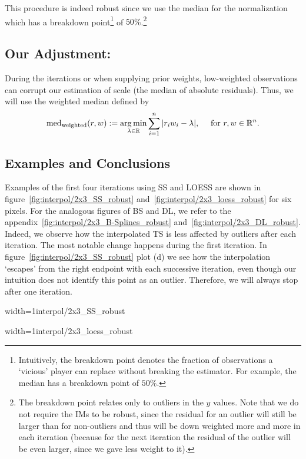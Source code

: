 {{		%
	}
	This procedure is indeed robust since we use the median for the normalization which has a breakdown point\footnote{Intuitively, the breakdown point denotes the fraction of observations a `vicious' player can replace without breaking the estimator. For example, the median has a breakdown point of $50 \%$.} of $50 \%$.\footnote{The breakdown point relates only to outliers in the $y$ values. Note that we do not require the {{IM}}s to be robust, since the residual for an outlier will  still be larger than for non-outliers and thus will be down weighted more and more in each iteration (because for the next iteration the residual of the outlier will be even larger, since we gave less weight to it).}
	\subsection{Our Adjustment:}{
		During the iterations or when supplying prior weights, low-weighted observations can corrupt our estimation of scale (the median of absolute residuals). Thus, we will use the weighted median defined by
		$$
			\operatorname{med}_\text{weighted}(r,w) := \operatorname*{arg\, min}_{\lambda \in \mathbb{R}} \sum_{i=1}^n |r_iw_i -\lambda|,
			\quad\text{ for }r,w\in \mathbb{R}^n.
		$$
		
	}
	\subsection{Examples and Conclusions}{		
		Examples of the first four iterations using SS and LOESS are shown in figure~\ref{fig:interpol/2x3_SS_robust} and~\ref{fig:interpol/2x3_loess_robust} for six pixels. For the analogous figures of BS and DL, we refer to the appendix~\ref{fig:interpol/2x3_B-Splines_robust} and~\ref{fig:interpol/2x3_DL_robust}.
		Indeed, we observe how the interpolated {TS} is less affected by outliers after each iteration. The most notable change happens during the first iteration. In figure~\ref{fig:interpol/2x3_SS_robust} plot (d) we see how the interpolation `escapes' from the right endpoint with each successive iteration, even though our intuition does not identify this point as an outlier. Therefore, we will always stop after one iteration.

		\begin{my_figure}[h]{width=1\textwidth}{interpol/2x3_SS_robust}
			\caption[Smoothing splines robustification.]{Smoothing splines \RobItPlot}
			\label{fig:interpol/2x3_SS_robust}
		\end{my_figure}
		\begin{my_figure}[h]{width=1\textwidth}{interpol/2x3_loess_robust}
			\caption[The LOESS smoother robustification.]{The LOESS smoother \RobItPlot}
			\label{fig:interpol/2x3_loess_robust}
		\end{my_figure}
	} 
	
}
